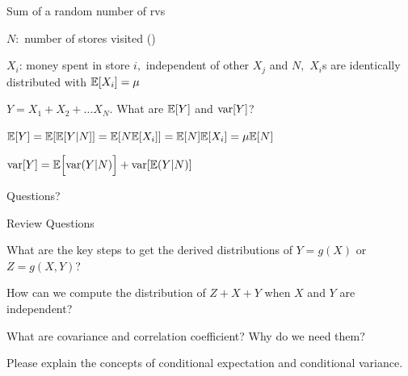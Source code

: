 \documentclass[fleqn,aspectratio=169]{beamer}
\begin{document}
\begin{frame}{Sum of a random number of rvs}

\plitemsep 0.1in

\bci 
\item<1-> $N:$ number of stores visited ()

\item<2-> $X_i$: money spent in store $i,$ independent of other $X_j$ and $N,$ $X_i$s are identically distributed with $\mathbb{E}[ X_i ] = \mu$

\item<3-> $Y = X_1 + X_2 + \ldots X_N.$ What are $\mathbb{E}[ Y ]$ and $\text{var}[ Y ]$?

\item<4-> $\mathbb{E}[ Y ] = \mathbb{E}[ \mathbb{E}[ Y|N ] ] = \mathbb{E}[ N\mathbb{E}[ X_i ] ] = \mathbb{E}[ N ]\mathbb{E}[ X_i ] = \mu \mathbb{E}[ N ]$

\item<5-> $\text{var}[ Y ] = \mathbb{E}\Bigl[ \text{var}( Y|N ) \Bigr] + \text{var}[ \mathbb{E}( Y|N ) ]$  


\eci


\end{frame}

\begin{frame}{}
\vspace{2cm}
\LARGE Questions?

\end{frame}

\begin{frame}{Review Questions}

\bce[1)]
\item What are the key steps to get the derived distributions of $Y=g(X)$ or $Z=g(X,Y)$?

\item How can we compute the distribution of $Z+X+Y$ when $X$ and $Y$ are independent?

\item What are covariance and correlation coefficient? Why do we need them?

\item Please explain the concepts of conditional expectation and conditional variance.

\ece

\end{frame}
\end{document}
